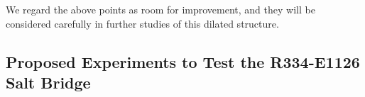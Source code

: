 
We regard the above points as room for improvement, and they will be considered carefully in further studies of this dilated structure.







\subsection{Proposed Experiments to Test the R334-E1126 Salt Bridge}

